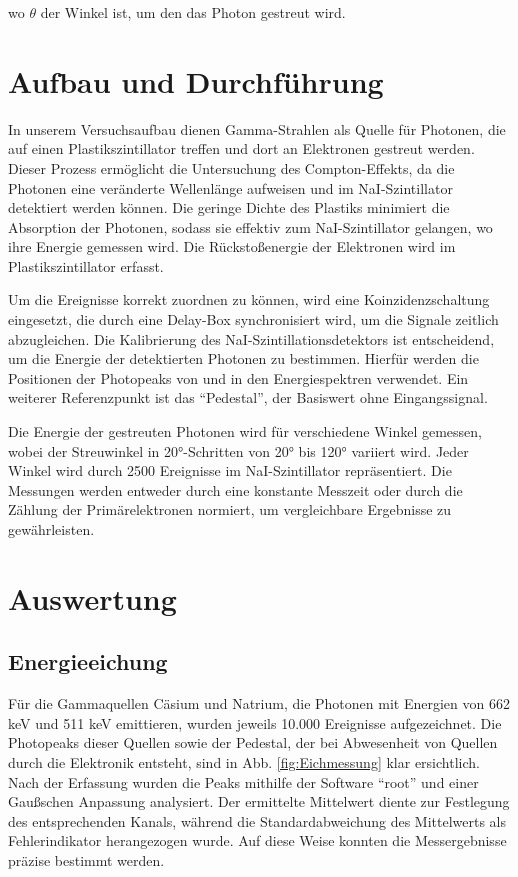 \documentclass[12pt,a4paper,ngerman]{report}
\begin{document}
wo $\theta$ der Winkel ist, um den das Photon gestreut wird.

	 \chapter{Aufbau und Durchführung}
		In unserem Versuchsaufbau dienen Gamma-Strahlen als Quelle für Photonen, die auf einen Plastikszintillator treffen und dort an Elektronen gestreut werden. Dieser Prozess ermöglicht die Untersuchung des Compton-Effekts, da die Photonen eine veränderte Wellenlänge aufweisen und im NaI-Szintillator detektiert werden können. Die geringe Dichte des Plastiks minimiert die Absorption der Photonen, sodass sie effektiv zum NaI-Szintillator gelangen, wo ihre Energie gemessen wird. Die Rückstoßenergie der Elektronen wird im Plastikszintillator erfasst.

		Um die Ereignisse korrekt zuordnen zu können, wird eine Koinzidenzschaltung eingesetzt, die durch eine Delay-Box synchronisiert wird, um die Signale zeitlich abzugleichen. Die Kalibrierung des NaI-Szintillationsdetektors ist entscheidend, um die Energie der detektierten Photonen zu bestimmen. Hierfür werden die Positionen der Photopeaks von  und  in den Energiespektren verwendet. Ein weiterer Referenzpunkt ist das “Pedestal”, der Basiswert ohne Eingangssignal.

		Die Energie der gestreuten Photonen wird für verschiedene Winkel gemessen, wobei der Streuwinkel in 20°-Schritten von 20° bis 120° variiert wird. Jeder Winkel wird durch 2500 Ereignisse im NaI-Szintillator repräsentiert. Die Messungen werden entweder durch eine konstante Messzeit oder durch die Zählung der Primärelektronen normiert, um vergleichbare Ergebnisse zu gewährleisten.
	 \chapter{Auswertung} %
		
		  \section{Energieeichung}
			  Für die Gammaquellen Cäsium und Natrium, die Photonen mit Energien von 662 keV und 511 keV emittieren, wurden jeweils 10.000 Ereignisse aufgezeichnet. Die Photopeaks dieser Quellen sowie der Pedestal, der bei Abwesenheit von Quellen durch die Elektronik entsteht, sind in Abb. \vref{fig:Eichmessung} klar ersichtlich. Nach der Erfassung wurden die Peaks mithilfe der Software “root” und einer Gaußschen Anpassung analysiert. Der ermittelte Mittelwert diente zur Festlegung des entsprechenden Kanals, während die Standardabweichung des Mittelwerts als Fehlerindikator herangezogen wurde. Auf diese Weise konnten die Messergebnisse präzise bestimmt werden.
			  
\end{document}
